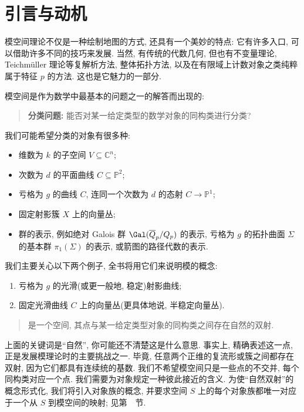 \chapter{引言与动机}\label{src:1}
\begin{epigraph}
模空间理论不仅是一种绘制地图的方式, 还具有一个美妙的特点: 它有许多入口, 可以借助许多不同的技巧来发展. 当然, 有传统的代数几何, 但也有不变量理论, Teichmüller 理论等复解析方法, 整体拓扑方法, 以及在有限域上计数对象之类纯粹属于特征 $p$ 的方法. 这也是它魅力的一部分.
\end{epigraph}
模空间是作为数学中最基本的问题之一的解答而出现的: 
\begin{quote}
\textbf{分类问题: }能否对某一给定类型的数学对象的同构类进行分类?
\end{quote}
我们可能希望分类的对象有很多种: 
\begin{itemize}
\item 维数为 $k$ 的子空间 $V\subseteq\mathbb C^n$; 
\item 次数为 $d$ 的平面曲线 $C\subseteq\mathbb P^2$; 
\item 亏格为 $g$ 的曲线 $C$, 连同一个次数为 $d$ 的态射 $C\to\mathbb P^1$; 
\item 固定射影簇 $X$ 上的向量丛; 
\item 群的表示, 例如绝对 Galois 群 $\Gal(\overline{\mathbb Q}_p/\mathbb Q_p)$ 的表示, 亏格为 $g$ 的拓扑曲面 $\Sigma$ 的基本群 $\pi_1(\Sigma)$ 的表示, 或箭图的路径代数的表示.
\end{itemize}
我们主要关心以下两个例子, 全书将用它们来说明模的概念: 
\begin{enumerate}[(1)]
\item 亏格为 $g$ 的光滑(或更一般地, 稳定)射影曲线; 
\item 固定光滑曲线 $C$ 上的向量丛(更具体地说, 半稳定向量丛).
\end{enumerate}
\begin{quote}
是一个空间, 其点与某一给定类型对象的同构类之间存在自然的双射.
\end{quote}
上面的关键词是``自然'', 你可能还不清楚这是什么意思. 事实上, 精确表述这一点, 正是发展模理论时的主要挑战之一. 毕竟, 任意两个正维的复流形或簇之间都存在双射, 因为它们都具有连续统的基数. 我们不希望模空间只是一些点的不交并, 每个同构类对应一个点. 我们需要为对象规定一种彼此接近的含义. 为使``自然双射''的概念形式化, 我们将引入对象族的概念, 并要求空间 $S$ 上的每个对象族都唯一对应于一个从 $S$ 到模空间的映射; 见第~~节.

